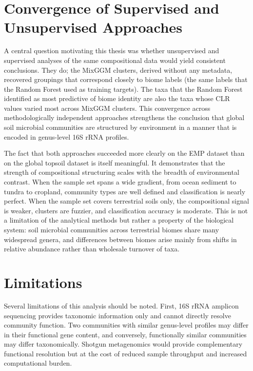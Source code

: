 \documentclass[12pt, oneside]{report}
\begin{document}
\section{Convergence of Supervised and Unsupervised Approaches}
\label{disc:convergence}

A central question motivating this thesis was whether unsupervised and supervised analyses
of the same compositional data would yield consistent conclusions. They do; the MixGGM
clusters, derived without any metadata, recovered groupings that correspond closely to
biome labels (the same labels that the Random Forest used as training targets). The taxa
that the Random Forest identified as most predictive of biome identity are also the taxa
whose CLR values varied most across MixGGM clusters. This convergence across
methodologically independent approaches strengthens the conclusion that global soil
microbial communities are structured by environment in a manner that is encoded in
genus-level 16S rRNA profiles.

The fact that both approaches succeeded more clearly on the EMP dataset than on the global
topsoil dataset is itself meaningful. It demonstrates that the strength of compositional
structuring scales with the breadth of environmental contrast. When the sample set spans a
wide gradient, from ocean sediment to tundra to cropland, community types are well
defined and classification is nearly perfect. When the sample set covers terrestrial soils
only, the compositional signal is weaker, clusters are fuzzier, and classification accuracy
is moderate. This is not a limitation of the analytical methods but rather a property of the
biological system: soil microbial communities across terrestrial biomes share many widespread genera, and differences between biomes arise mainly from shifts in relative abundance rather than wholesale turnover of taxa.

\section{Limitations}
\label{disc:limitations}

Several limitations of this analysis should be noted. First, 16S rRNA amplicon sequencing
provides taxonomic information only and cannot directly resolve community function. Two
communities with similar genus-level profiles may differ in their functional gene content,
and conversely, functionally similar communities may differ taxonomically. Shotgun
metagenomics would provide complementary functional resolution but at the cost of reduced
sample throughput and increased computational burden.
\end{document}
